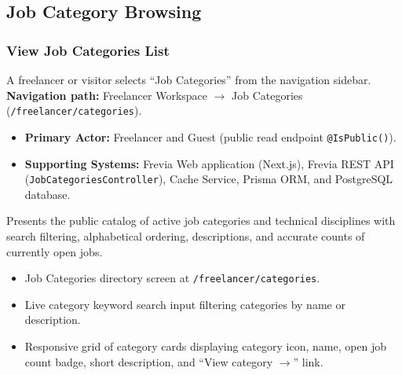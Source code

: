 
\subsection{Job Category Browsing}

\subsubsection{View Job Categories List}

A freelancer or visitor selects ``Job Categories'' from the navigation sidebar.\newline
\textbf{Navigation path:} Freelancer Workspace $\rightarrow$ Job Categories (\texttt{/\allowbreak{}freelancer/\allowbreak{}categories}).


\begin{itemize}[leftmargin=1.6em,topsep=3pt,itemsep=2pt,parsep=0pt,label=$\bullet$]
    \item \textbf{Primary Actor:} Freelancer and Guest (public read endpoint \texttt{@IsPublic()}).
    \item \textbf{Supporting Systems:} Frevia Web application (Next.js), Frevia REST API (\texttt{JobCategoriesController}), Cache Service, Prisma ORM, and PostgreSQL database.
\end{itemize}

\noindent Presents the public catalog of active job categories and technical disciplines with search filtering, alphabetical ordering, descriptions, and accurate counts of currently open jobs.

\begin{itemize}[leftmargin=1.6em,topsep=3pt,itemsep=2pt,parsep=0pt,label=$\bullet$]
    \item Job Categories directory screen at \texttt{/freelancer/categories}.
    \item Live category keyword search input filtering categories by name or description.
    \item Responsive grid of category cards displaying category icon, name, open job count badge, short description, and ``View category $\rightarrow$'' link.
\end{itemize}

